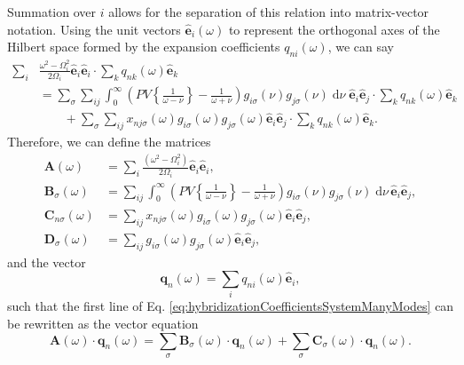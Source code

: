 Summation over $i$ allows for the separation of this relation into matrix-vector notation. Using the unit vectors $\hat{\mathbf{e}}_i(\omega)$ to represent the orthogonal axes of the Hilbert space formed by the expansion coefficients $q_{ni}(\omega)$, we can say
\begin{equation}
\begin{split}
\sum_i&\frac{\omega^2 - \Omega_i^2}{2\Omega_i}\hat{\mathbf{e}}_i\hat{\mathbf{e}}_i\cdot\sum_kq_{nk}(\omega)\hat{\mathbf{e}}_k\\
&= \sum_\sigma\sum_{ij}\int_0^\infty\left(PV\left\{\frac{1}{\omega - \nu }\right\} - \frac{1}{\omega + \nu }\right)g_{i\sigma}(\nu)g_{j\sigma}(\nu)\;\mathrm{d}\nu\;\hat{\mathbf{e}}_i\hat{\mathbf{e}}_j\cdot\sum_kq_{nk}(\omega)\hat{\mathbf{e}}_k\\
&\qquad + \sum_{\sigma}\sum_{ij}x_{nj\sigma}(\omega)g_{i\sigma}(\omega)g_{j\sigma}(\omega)\hat{\mathbf{e}}_i\hat{\mathbf{e}}_j\cdot\sum_kq_{nk
}(\omega)\hat{\mathbf{e}}_k.
\end{split}
\end{equation}
Therefore, we can define the matrices 
\begin{equation}
\begin{split}
\mathbf{A}(\omega) &= \sum_i\frac{(\omega^2 - \Omega_i^2)}{2\Omega_i}\hat{\mathbf{e}}_i\hat{\mathbf{e}}_i,\\
\mathbf{B}_\sigma(\omega) &= \sum_{ij}\int_0^\infty\left(PV\left\{\frac{1}{\omega - \nu }\right\} - \frac{1}{\omega + \nu }\right)g_{i\sigma}(\nu)g_{j\sigma}(\nu)\;\mathrm{d}\nu\,\hat{\mathbf{e}}_i\hat{\mathbf{e}}_j,\\
\mathbf{C}_{n\sigma}(\omega) &= \sum_{ij} x_{nj\sigma}(\omega)g_{i\sigma}(\omega)g_{j\sigma}(\omega)\hat{\mathbf{e}}_i\hat{\mathbf{e}}_j,\\
\mathbf{D}_\sigma(\omega) &= \sum_{ij}g_{i\sigma}(\omega)g_{j\sigma}(\omega)\hat{\mathbf{e}}_i\hat{\mathbf{e}}_j,
\end{split}
\end{equation}
and the vector
\begin{equation}
\mathbf{q}_n(\omega) = \sum_iq_{ni}(\omega)\hat{\mathbf{e}}_i,
\end{equation}
such that the first line of Eq. \eqref{eq:hybridizationCoefficientsSystemManyModes} can be rewritten as the vector equation
\begin{equation}\label{eq:ABCmatrixIdentity}
\mathbf{A}(\omega)\cdot\mathbf{q}_n(\omega) = \sum_\sigma\mathbf{B}_\sigma(\omega)\cdot\mathbf{q}_n(\omega) + \sum_\sigma \mathbf{C}_\sigma(\omega)\cdot\mathbf{q}_n(\omega).
\end{equation}

